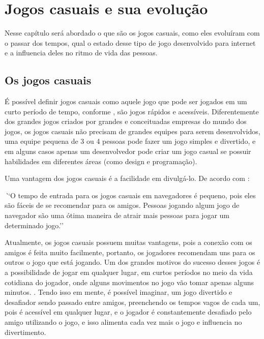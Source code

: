 \section{Jogos casuais e sua evolução}

Nesse capítulo será abordado o que são os jogos casuais, como eles
evoluíram com o passar dos tempos, qual o estado desse tipo de jogo
desenvolvido para internet e a influencia deles no ritmo de vida das
pessoas.

\subsection{Os jogos casuais}

É possível definir jogos casuais como aquele jogo que pode ser jogados em um curto período
de tempo, conforme , são jogos rápidos e acessíveis.
Diferentemente dos grandes jogos criados por grandes e conceituadas
empresas do mundo dos jogos, os jogos casuais não precisam de grandes
equipes para serem desenvolvidos, uma equipe pequena de 3 ou 4 pessoas
pode fazer um jogo simples e divertido, e em alguns casos apenas um
desenvolvedor pode criar um jogo casual se possuir habilidades em
diferentes áreas (como design e programação).

Uma vantagem dos jogos casuais é a facilidade em divulgá-lo. De acordo com
:

\begin{singlespacing}
\begin{citacao}{4cm}{0cm}\footnotesize \emph
    ``O tempo de entrada para os jogos casuais em navegadores é pequeno,
    pois eles são fáceis de se recomendar para os amigos. Pessoas jogando
    algum jogo de navegador são uma ótima maneira de atrair mais
    pessoas para jogar um determinado jogo.''
\end{citacao}
\end{singlespacing}

Atualmente, os jogos casuais possuem muitas vantagens, pois a conexão
com os amigos é feita muito facilmente, portanto, os jogadores
recomendam uns para os outros o jogo que está jogando.
Um dos grandes motivos do sucesso desses jogos é a possibilidade de
jogar em qualquer lugar, em curtos períodos no meio da vida cotidiana
do jogador, onde alguns movimentos no jogo vão tomar apenas alguns
minutos. \cite{ozcan2010recent}.
Tendo isso em mente, é possível imaginar, um jogo divertido e desafiador
sendo passado entre amigos, preenchendo os tempos vagos de cada um,
pois é acessível em qualquer lugar, e o jogador é constantemente
desafiado pelo amigo utilizando o jogo, e isso alimenta cada vez mais
o jogo e influencia no divertimento.

